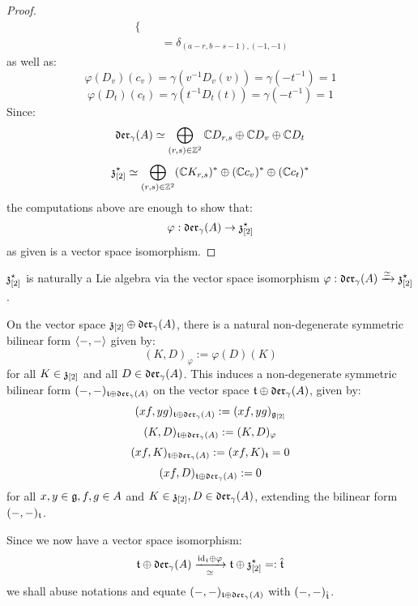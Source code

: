 \begin{proof}
$$\begin{aligned}
\begin{cases}
                            \end{cases}
                            \\
                            & = \delta_{(a - r, b - s - 1), (-1, -1)}
                        \end{aligned}
                    $$
                as well as:
                    $$\varphi(D_v)(c_v) = \gamma(v^{-1} D_v(v)) = \gamma( -t^{-1} ) = 1$$
                    $$\varphi(D_t)(c_t) = \gamma(t^{-1} D_t(t)) = \gamma( -t^{-1} ) = 1$$
                Since:
                    $$\mathfrak{der}_{\gamma}(A) \simeq \bigoplus_{(r, s) \in \mathbb{Z}^2} \mathbb{C} D_{r, s} \oplus \mathbb{C} D_v \oplus \mathbb{C} D_t$$
                    $$\mathfrak{z}_{[2]}^{\star} \simeq \bigoplus_{(r, s) \in \mathbb{Z}^2} (\mathbb{C} K_{r, s})^* \oplus (\mathbb{C} c_v)^* \oplus (\mathbb{C} c_t)^*$$
                the computations above are enough to show that:
                    $$\varphi: \mathfrak{der}_{\gamma}(A) \to \mathfrak{z}_{[2]}^{\star}$$
                as given is a vector space isomorphism.
            \end{proof}
        \begin{corollary} \label{coro: lie_bracket_on_graded_dual_of_toroidal_centres}
            $\mathfrak{z}_{[2]}^{\star}$ is naturally a Lie algebra via the vector space isomorphism $\varphi: \mathfrak{der}_{\gamma}(A) \xrightarrow[]{\simeq} \mathfrak{z}_{[2]}^{\star}$.
        \end{corollary}
        \begin{corollary} \label{coro: pairing_yangian_div_zero_vector_fields_and_cyclic_1_forms}
            On the vector space $\mathfrak{z}_{[2]} \oplus \mathfrak{der}_{\gamma}(A)$, there is a natural non-degenerate symmetric bilinear form $\langle-, -\rangle$ given by:
                $$( K, D )_{\varphi} := \varphi(D)(K)$$
            for all $K \in \mathfrak{z}_{[2]}$ and all $D \in \mathfrak{der}_{\gamma}(A)$. This induces a non-degenerate symmetric bilinear form $(-, -)_{\mathfrak{t} \oplus \mathfrak{der}_{\gamma}(A)}$ on the vector space $\mathfrak{t} \oplus \mathfrak{der}_{\gamma}(A)$, given by:
                $$(xf, yg)_{\mathfrak{t} \oplus \mathfrak{der}_{\gamma}(A)} := (xf, yg)_{\mathfrak{g}_{[2]}}$$
                $$(K, D)_{\mathfrak{t} \oplus \mathfrak{der}_{\gamma}(A)} := (K, D)_{\varphi}$$
                $$(xf, K)_{\mathfrak{t} \oplus \mathfrak{der}_{\gamma}(A)} := (xf, K)_{\mathfrak{t}} = 0$$
                $$(xf, D)_{\mathfrak{t} \oplus \mathfrak{der}_{\gamma}(A)} := 0$$
            for all $x, y \in \mathfrak{g}, f, g \in A$ and $K \in \mathfrak{z}_{[2]}, D \in \mathfrak{der}_{\gamma}(A)$, extending the bilinear form $(-, -)_{\mathfrak{t}}$.
        \end{corollary}
        \begin{convention}
            Since we now have a vector space isomorphism:
                $$\mathfrak{t} \oplus \mathfrak{der}_{\gamma}(A) \xrightarrow[\simeq]{\mathrm{id}_{\mathfrak{t}} \oplus \varphi} \mathfrak{t} \oplus \mathfrak{z}_{[2]}^{\star} =: \hat{\mathfrak{t}}$$
            we shall abuse notations and equate $(-, -)_{\mathfrak{t} \oplus \mathfrak{der}_{\gamma}(A)}$ with $(-, -)_{\hat{\mathfrak{t}}}$.
        \end{convention}
